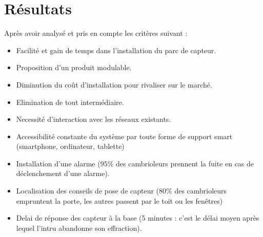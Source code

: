 \chapter{Résultats}

Après avoir analysé et pris en compte les critères suivant : 
\begin{itemize}
\item Facilité et gain de temps dans l'installation du parc de capteur.
\item Proposition d'un produit modulable.
\item Diminution du coût d'installation pour rivaliser sur le marché.
\item Elimination de tout intermédiaire.
\item Necessité d'interaction avec les réseaux existants.
\item Accessibilité constante du système par toute forme de support smart (smartphone, ordinateur, tablette) 
\item Installation d'une alarme ($95\%$ des cambrioleurs prennent la fuite en cas de déclenchement d’une alarme).
\item Localisation des conseils de pose de capteur ($80\%$ des cambrioleurs empruntent la porte, les autres passent par le toit ou les fenêtres)
\item Delai de réponse des capteur à la base (5 minutes : c'est le délai moyen après lequel l'intru abandonne son effraction).\\
\end{itemize}

